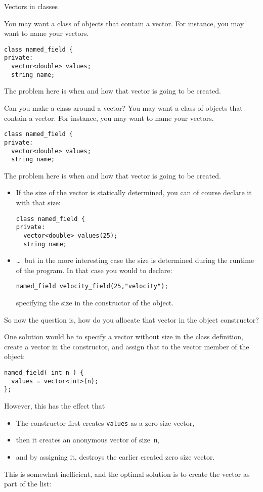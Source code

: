  {Vectors in classes}
\label{sec:class-w-vector}

You may want a class of objects that contain a vector.
For instance, you may want to name your vectors.
\begin{lstlisting}
class named_field {
private:
  vector<double> values;
  string name;
\end{lstlisting}
The problem here is when and how that vector is going to be created.

\begin{slide}{Can you make a class around a vector?}
  \label{sl:class-with-vector}
You may want a class of objects that contain a vector.
For instance, you may want to name your vectors.
  \lstset{style=snippetcode}
\begin{lstlisting}
class named_field {
private:
  vector<double> values;
  string name;
\end{lstlisting}
The problem here is when and how that vector is going to be created.
\end{slide}

\begin{itemize}
\item If the size of the vector is statically determined,
  you can of course declare it with that size:
\begin{lstlisting}
class named_field {
private:
  vector<double> values(25);
  string name;
\end{lstlisting}
\item \ldots~but in the more interesting case the size is determined
  during the runtime of the program. In that case you would to declare:
\begin{lstlisting}
named_field velocity_field(25,"velocity");
\end{lstlisting}
specifying the size in the constructor of the object.
\end{itemize}

So now the question is, how do you allocate that vector
in the object constructor?

One solution would be to specify a vector without size in the class
definition, create a vector in the constructor, and assign that
to the vector member of the object:
\begin{lstlisting}
named_field( int n ) {
  values = vector<int>(n);
};
\end{lstlisting}
However, this has the effect that
\begin{itemize}
\item The constructor first creates \lstinline{values} as a zero size vector,
\item then it creates an anonymous vector of size~\lstinline{n},
\item and by assigning it, destroys the earlier created zero size vector.
\end{itemize}
This is somewhat inefficient, and the optimal solution is
to create the vector as part of the
 list:

